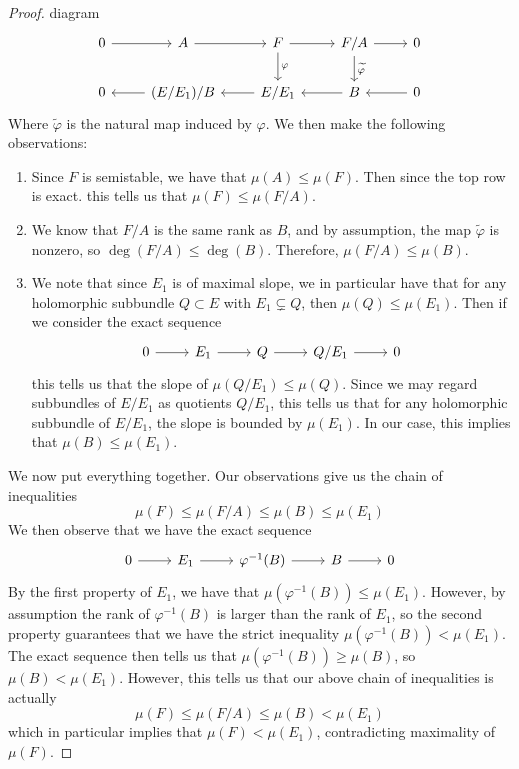 \documentclass[psamsfonts, 12pt]{amsart}
\theoremstyle{definition}
\theoremstyle{remark}
\newcommand{\inv}{^{-1}}
\begin{document}
\begin{proof}
diagram
\[\begin{tikzcd}
0 \ar[r] & A \ar[r] & F \ar[r] \ar[d,"\varphi"]
& F/A \ar[r]\ar[d,"\widetilde{\varphi}"] & 0 \\
0 & (E/E_1)/B \ar[l] & E/E_1 \ar[l] & B \ar[l] & 0 \ar[l]
\end{tikzcd}\]
Where $\widetilde{\varphi}$ is the natural map induced by $\varphi$. We then
make the following observations:
\begin{enumerate}
  \item Since $F$ is semistable, we have that $\mu(A) \leq \mu(F)$. Then since
  the top row is exact. this tells us that $\mu(F) \leq \mu(F/A)$.
  \item We know that $F/A$ is the same rank as $B$, and by assumption, the map
  $\widetilde{\varphi}$ is nonzero, so $\deg(F/A) \leq \deg(B)$. Therefore,
  $\mu(F/A) \leq \mu(B)$.
  \item We note that since $E_1$ is of maximal slope, we in particular have that
  for any holomorphic subbundle $Q \subset E$ with $E_1 \subsetneq Q$, then
  $\mu(Q) \leq \mu(E_1)$. Then if we consider the exact sequence
  \[\begin{tikzcd}
  0 \ar[r] & E_1 \ar[r] & Q \ar[r] & Q/E_1 \ar[r] & 0
  \end{tikzcd}\]
  this tells us that the slope of $\mu(Q/E_1) \leq \mu(Q)$. Since we may
  regard subbundles of $E/E_1$ as quotients $Q/E_1$, this tells us that for
  any holomorphic subbundle of $E/E_1$, the slope is bounded by $\mu(E_1)$. In
  our case, this implies that $\mu(B) \leq \mu(E_1)$.
\end{enumerate}
We now put everything together. Our observations give us the chain of inequalities
\[
\mu(F) \leq \mu(F/A) \leq \mu(B) \leq \mu(E_1)
\]
We then observe that we have the exact sequence
\[\begin{tikzcd}
0 \ar[r] & E_1 \ar[r] & \varphi\inv(B) \ar[r] & B \ar[r] & 0
\end{tikzcd}\]
By the first property of $E_1$, we have that $\mu(\varphi\inv(B)) \leq \mu(E_1)$.
However, by assumption the rank of $\varphi\inv(B)$ is larger than the rank of $E_1$,
so the second property guarantees that we have the strict inequality
$\mu(\varphi\inv(B)) < \mu(E_1)$. The exact sequence then tells us that
$\mu(\varphi\inv(B)) \geq \mu(B)$, so $\mu(B) < \mu(E_1)$. However,
this tells us that our above chain of inequalities is actually
\[
\mu(F) \leq \mu(F/A) \leq \mu(B) < \mu(E_1)
\]
which in particular implies that $\mu(F) < \mu(E_1)$, contradicting maximality of
$\mu(F)$.
\end{proof}
\end{document}
